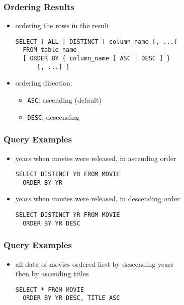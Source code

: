 \documentclass[dvipsnames]{beamer}
\theoremstyle{plain}
\begin{document}
\begin{frame}[fragile]
  \frametitle{Ordering Results}

  \begin{itemize}
    \item ordering the rows in the result
    \begin{lstlisting}
SELECT [ ALL | DISTINCT ] column_name [, ...]
  FROM table_name
  [ ORDER BY { column_name [ ASC | DESC ] }
      [, ...] ]
    \end{lstlisting}

    \medskip
    \item ordering direction:
    \begin{itemize}
      \item \lstinline!ASC!: ascending (default)
      \item \lstinline!DESC!: descending
    \end{itemize}
  \end{itemize}
\end{frame}

\begin{frame}[fragile]
  \frametitle{Query Examples}

  \begin{itemize}
    \item years when movies were released, in ascending order
    \begin{lstlisting}
SELECT DISTINCT YR FROM MOVIE
  ORDER BY YR
    \end{lstlisting}

    \pause
    \item years when movies were released, in descending order
    \begin{lstlisting}
SELECT DISTINCT YR FROM MOVIE
  ORDER BY YR DESC
    \end{lstlisting}
  \end{itemize}
\end{frame}

\begin{frame}[fragile]
  \frametitle{Query Examples}

  \begin{itemize}
    \item all data of movies ordered first by descending years\\
      then by ascending titles
    \begin{lstlisting}
SELECT * FROM MOVIE
  ORDER BY YR DESC, TITLE ASC
    \end{lstlisting}
  \end{itemize}
\end{frame}
\end{document}
